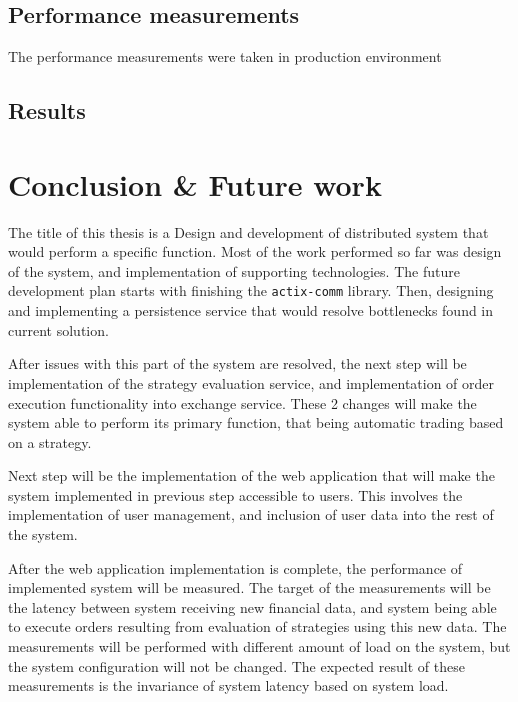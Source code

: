 \section{Performance measurements}
The performance measurements were taken in production environment
\section{Results}


\chapter{Conclusion \& Future work}
The title of this thesis is a Design and development of distributed system that would perform a specific function.
Most of the work performed so far was design of the system, and implementation of supporting technologies. The
future development plan starts with finishing the \verb|actix-comm| library. Then, designing and implementing a persistence
service that would resolve bottlenecks found in current solution.

After issues with this part of the system are resolved, the next step will be implementation of the strategy evaluation service,
and implementation of order execution functionality into exchange service. These 2 changes will make the system able to perform its
primary function, that being automatic trading based on a strategy.

Next step will be the implementation
of the web application that will make the system implemented in previous step accessible to users. This involves the implementation of user management,
and inclusion of user data into the rest of the system.

After the web application implementation is complete, the performance of implemented system will be measured. The target of the measurements
will be the latency between system receiving new financial data, and system being able to execute orders resulting from
evaluation of strategies using this new data. The measurements will be performed with different amount of
load on the system, but the system configuration will not be changed. The expected result of these measurements is the
invariance of system latency based on system load.



